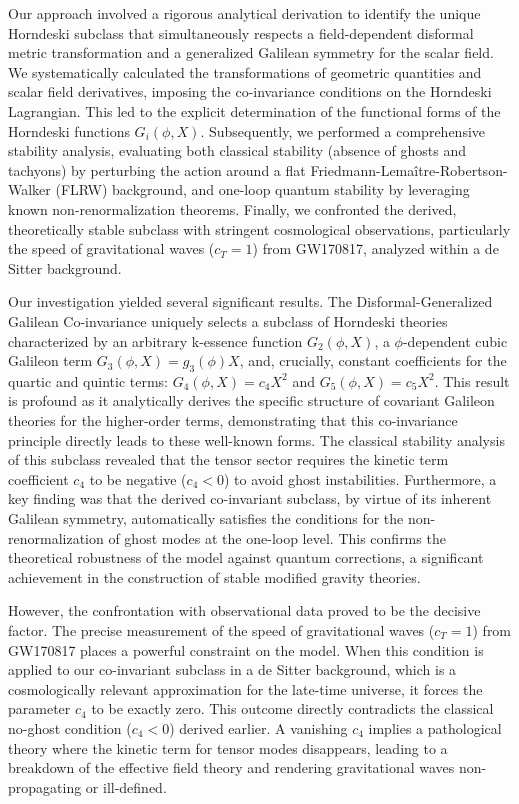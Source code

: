 \documentclass[twocolumn]{aastex631}
\begin{document}
Our approach involved a rigorous analytical derivation to identify the unique Horndeski subclass that simultaneously respects a field-dependent disformal metric transformation and a generalized Galilean symmetry for the scalar field. We systematically calculated the transformations of geometric quantities and scalar field derivatives, imposing the co-invariance conditions on the Horndeski Lagrangian. This led to the explicit determination of the functional forms of the Horndeski functions $G_i(\phi, X)$. Subsequently, we performed a comprehensive stability analysis, evaluating both classical stability (absence of ghosts and tachyons) by perturbing the action around a flat Friedmann-Lemaître-Robertson-Walker (FLRW) background, and one-loop quantum stability by leveraging known non-renormalization theorems. Finally, we confronted the derived, theoretically stable subclass with stringent cosmological observations, particularly the speed of gravitational waves ($c_T=1$) from GW170817, analyzed within a de Sitter background.

Our investigation yielded several significant results. The Disformal-Generalized Galilean Co-invariance uniquely selects a subclass of Horndeski theories characterized by an arbitrary k-essence function $G_2(\phi, X)$, a $\phi$-dependent cubic Galileon term $G_3(\phi, X) = g_3(\phi) X$, and, crucially, constant coefficients for the quartic and quintic terms: $G_4(\phi, X) = c_4 X^2$ and $G_5(\phi, X) = c_5 X^2$. This result is profound as it analytically derives the specific structure of covariant Galileon theories for the higher-order terms, demonstrating that this co-invariance principle directly leads to these well-known forms. The classical stability analysis of this subclass revealed that the tensor sector requires the kinetic term coefficient $c_4$ to be negative ($c_4 < 0$) to avoid ghost instabilities. Furthermore, a key finding was that the derived co-invariant subclass, by virtue of its inherent Galilean symmetry, automatically satisfies the conditions for the non-renormalization of ghost modes at the one-loop level. This confirms the theoretical robustness of the model against quantum corrections, a significant achievement in the construction of stable modified gravity theories.

However, the confrontation with observational data proved to be the decisive factor. The precise measurement of the speed of gravitational waves ($c_T=1$) from GW170817 places a powerful constraint on the model. When this condition is applied to our co-invariant subclass in a de Sitter background, which is a cosmologically relevant approximation for the late-time universe, it forces the parameter $c_4$ to be exactly zero. This outcome directly contradicts the classical no-ghost condition ($c_4 < 0$) derived earlier. A vanishing $c_4$ implies a pathological theory where the kinetic term for tensor modes disappears, leading to a breakdown of the effective field theory and rendering gravitational waves non-propagating or ill-defined.
\end{document}
